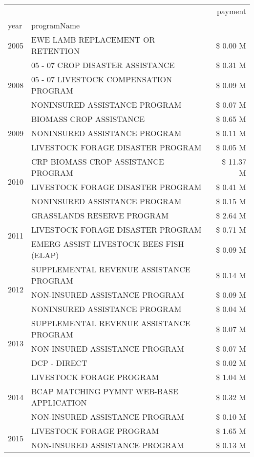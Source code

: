 \begin{tabular}{llr}
\toprule
 &  & payment \\
year & programName &  \\
\midrule
2005 & EWE LAMB REPLACEMENT OR RETENTION & \$ 0.00 M \\
\cline{1-3}
\multirow[t]{3}{*}{2008} & 05 - 07 CROP DISASTER ASSISTANCE & \$ 0.31 M \\
 & 05 - 07 LIVESTOCK COMPENSATION PROGRAM & \$ 0.09 M \\
 & NONINSURED ASSISTANCE PROGRAM & \$ 0.07 M \\
\cline{1-3}
\multirow[t]{3}{*}{2009} & BIOMASS CROP ASSISTANCE & \$ 0.65 M \\
 & NONINSURED ASSISTANCE PROGRAM & \$ 0.11 M \\
 & LIVESTOCK FORAGE DISASTER  PROGRAM & \$ 0.05 M \\
\cline{1-3}
\multirow[t]{3}{*}{2010} & CRP BIOMASS CROP ASSISTANCE PROGRAM & \$ 11.37 M \\
 & LIVESTOCK FORAGE DISASTER PROGRAM & \$ 0.41 M \\
 & NONINSURED ASSISTANCE PROGRAM & \$ 0.15 M \\
\cline{1-3}
\multirow[t]{3}{*}{2011} & GRASSLANDS RESERVE PROGRAM & \$ 2.64 M \\
 & LIVESTOCK FORAGE DISASTER PROGRAM & \$ 0.71 M \\
 & EMERG ASSIST LIVESTOCK BEES FISH (ELAP) & \$ 0.09 M \\
\cline{1-3}
\multirow[t]{3}{*}{2012} & SUPPLEMENTAL REVENUE ASSISTANCE PROGRAM & \$ 0.14 M \\
 & NON-INSURED ASSISTANCE PROGRAM & \$ 0.09 M \\
 & NONINSURED ASSISTANCE PROGRAM & \$ 0.04 M \\
\cline{1-3}
\multirow[t]{3}{*}{2013} & SUPPLEMENTAL REVENUE ASSISTANCE PROGRAM & \$ 0.07 M \\
 & NON-INSURED ASSISTANCE PROGRAM & \$ 0.07 M \\
 & DCP - DIRECT & \$ 0.02 M \\
\cline{1-3}
\multirow[t]{3}{*}{2014} & LIVESTOCK FORAGE PROGRAM & \$ 1.04 M \\
 & BCAP MATCHING PYMNT WEB-BASE APPLICATION & \$ 0.32 M \\
 & NON-INSURED ASSISTANCE PROGRAM & \$ 0.10 M \\
\cline{1-3}
\multirow[t]{3}{*}{2015} & LIVESTOCK FORAGE PROGRAM & \$ 1.65 M \\
 & NON-INSURED ASSISTANCE PROGRAM & \$ 0.13 M \\

\end{tabular}
